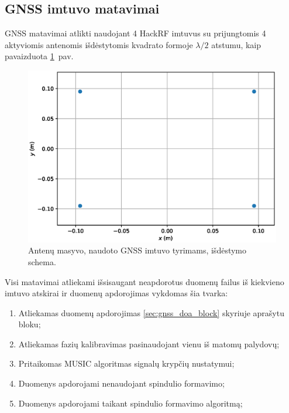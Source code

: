 \documentclass[main.tex]{subfiles}
\begin{document}
\subsection{GNSS imtuvo matavimai}

GNSS matavimai atlikti naudojant 4 HackRF imtuvus su prijungtomis
4 aktyviomis antenomis išdėstytomis kvadrato formoje $\lambda / 2$
atstumu, kaip pavaizduota \ref{fig:gnss_antenna_patern}~pav.

\begin{figure}[h]
    \begin{centering}
    \includegraphics[scale=0.65]{drawings/antenna_pattern}
    \par\end{centering}
    \protect\caption{\label{fig:gnss_antenna_patern}Antenų masyvo, naudoto GNSS imtuvo tyrimams, išdėstymo schema.}
\end{figure}

Visi matavimai atliekami išsisaugant neapdorotus duomenų failus iš kiekvieno
imtuvo atskirai ir duomenų apdorojimas vykdomas šia tvarka:

\begin{enumerate}
    \item Atliekamas duomenų apdorojimas \ref{sec:gnss_doa_block} skyriuje aprašytu bloku;
    \item Atliekamas fazių kalibravimas pasinaudojant vienu iš matomų palydovų;
    \item Pritaikomas MUSIC algoritmas signalų krypčių nustatymui;
    \item Duomenys apdorojami nenaudojant spindulio formavimo;
    \item Duomenys apdorojami taikant spindulio formavimo algoritmą;
\end{enumerate}
\end{document}
